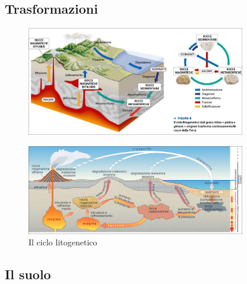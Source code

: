 \documentclass[a4paper]{article}
\begin{document}

\subsection{Trasformazioni}

\begin{center}
\begin{figure}[h]
    \centering
    \includegraphics[width=0.85\textwidth]{./trasformazioni.png}
\end{figure}
\end{center}

\begin{center}
\begin{figure}[h]
    \centering
    \includegraphics[width=0.85\textwidth]{./ciclo_litogenetico.png}
    \caption{Il ciclo litogenetico}
\end{figure}
\end{center}

\pagebreak

\subsection{Il suolo}
\end{document}
